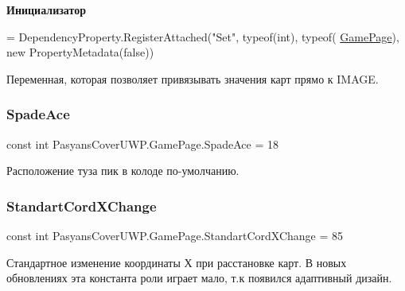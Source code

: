 {\bfseries Инициализатор}
\begin{DoxyCode}
=
            DependencyProperty.RegisterAttached(\textcolor{stringliteral}{"Set"}, typeof(\textcolor{keywordtype}{int}), typeof(
      \hyperlink{class_pasyans_cover_u_w_p_1_1_game_page_ae93f35d902ec5fbb566632b0dc5e0b59}{GamePage}), \textcolor{keyword}{new} PropertyMetadata(\textcolor{keyword}{false}))
\end{DoxyCode}


Переменная, которая позволяет привязывать значения карт прямо к I\+M\+A\+GE. 

\mbox{\label{class_pasyans_cover_u_w_p_1_1_game_page_afaebf6ffd47185bb4fa3b7a868eab00d}} 
\subsubsection{\texorpdfstring{Spade\+Ace}{SpadeAce}}
{\footnotesize\ttfamily const int Pasyans\+Cover\+U\+W\+P.\+Game\+Page.\+Spade\+Ace = 18\hspace{0.3cm}{\ttfamily [private]}}



Расположение туза пик в колоде по-\/умолчанию. 

\mbox{\label{class_pasyans_cover_u_w_p_1_1_game_page_aa61e21ef4cdac5b45ff280528dc5611e}} 
\subsubsection{\texorpdfstring{Standart\+Cord\+X\+Change}{StandartCordXChange}}
{\footnotesize\ttfamily const int Pasyans\+Cover\+U\+W\+P.\+Game\+Page.\+Standart\+Cord\+X\+Change = 85\hspace{0.3cm}{\ttfamily [private]}}



Стандартное изменение координаты Х при расстановке карт. В новых обновлениях эта константа роли играет мало, т.\+к появился адаптивный дизайн. 

